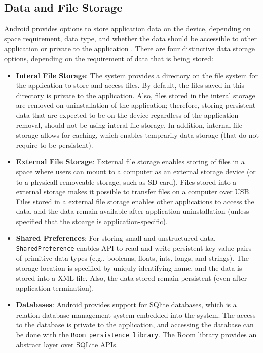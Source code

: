 \subsection{Data and File Storage}
Android provides options to store application data on the device, depending on space requirement, data type, and whether the data should be accessible to other application or private to the application \cite{filestorage}. There are four distinctive data storage options, depending on the requirement of data that is being stored:
\begin{itemize}
    \item \textbf{Interal File Storage}: The system provides a directory on the file system for the application to store and access files. By default, the files saved in this directory is private to the application. Also, files stored in the interal storage are removed on uninstallation of the application; therefore, storing persistent data that are expected to be on the device regardless of the application removal, should not be using interal file storage. In addition, internal file storage allows for caching, which enables temprarily data storage (that do not require to be persistent). 
    \item \textbf{External File Storage}: External file storage enables storing of files in a space where users can mount to a computer as an external storage device (or to a physicall removeable storage, such as SD card). Files stored into a external storage makes it possible to transfer files on a computer over USB. Files stored in a external file storage enables other applications to access the data, and the data remain available after application uninstallation (unless specified that the stoarge is application-specific). 
    \item \textbf{Shared Preferences}: For storing small and unstructured data, \verb|SharedPreference| enables API to read and write persistent key-value pairs of primitive data types (e.g., booleans, floats, ints, longs, and strings). The storage location is specified by uniquly identifying name, and the data is stored into a XML file. Also, the data stored remain persistent (even after application termination). 
    \item \textbf{Databases}: Android provides support for SQlite databases, which is a relation database management system embedded into the system. The access to the database is private to the application, and accessing the database can be done with the \verb|Room persistence library|. The Room library provides an abstract layer over SQLite APIs.  
\end{itemize}


